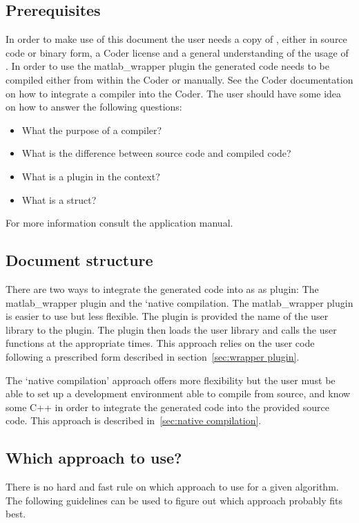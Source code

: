 \documentclass[11pt,a4paper,twoside]{article}
\newcommand{\+}{\discretionary{\mbox{\scriptsize$\hookleftarrow$}}{}{}}
\begin{document}
\subsection*{Prerequisites}
In order to make use of this document the user needs a copy of \mha{}, either
in source code or binary form, a \Matlab{} Coder license and a general
understanding of the usage of \mha{}. In order to use the matlab\_wrapper plugin
the generated code needs to be compiled either from within the \Matlab{} Coder
or manually. See the \Matlab{} Coder documentation on how to integrate a compiler
into the Coder.
The user should have some idea on how to answer the following questions:
\begin{itemize}
\item What the purpose of a compiler?
\item What is the difference between source code and compiled code?
\item What is a plugin in the \mha{} context?
\item What is a \Matlab{} struct?
\end{itemize}
For more information consult the \mha{} application manual.

\subsection*{Document structure}
There are two ways to integrate the generated code into \mha{} as 
as plugin: The matlab\_wrapper plugin and the `native compilation. The matlab\_wrapper
plugin is easier to use but less flexible. The plugin is provided the name of
the user library to the plugin. The plugin then loads the user library and calls the user functions at the appropriate times.
This approach relies on the user code following a prescribed form described in section~\ref{sec:wrapper plugin}.

The `native compilation' approach offers more flexibility but the user must be able to set up a development environment
able to compile \mha{} from source, and know some C++ in order to integrate the
generated code into the provided source code. This approach is described in~\ref{sec:native compilation}.

\subsection*{Which approach to use?}
There is no hard and fast rule on which approach to use for a given algorithm. The
following guidelines can be used to figure out which approach probably fits best.
\end{document}
